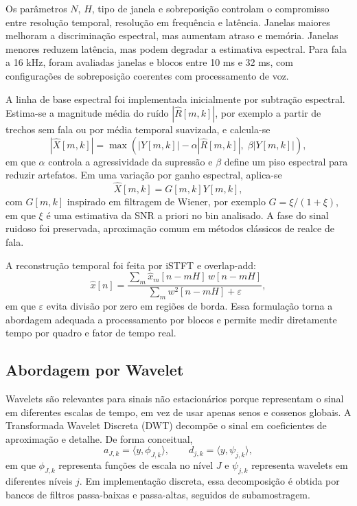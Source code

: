 Os parâmetros \(N\), \(H\), tipo de janela e sobreposição controlam o compromisso entre resolução temporal, resolução em frequência e latência. Janelas maiores melhoram a discriminação espectral, mas aumentam atraso e memória. Janelas menores reduzem latência, mas podem degradar a estimativa espectral. Para fala a 16 kHz, foram avaliadas janelas e blocos entre 10 ms e 32 ms, com configurações de sobreposição coerentes com processamento de voz.

A linha de base espectral foi implementada inicialmente por subtração espectral. Estima-se a magnitude média do ruído \(|\hat{R}[m,k]|\), por exemplo a partir de trechos sem fala ou por média temporal suavizada, e calcula-se
\begin{equation}
    |\hat{X}[m,k]| = \max\left(|Y[m,k]| - \alpha |\hat{R}[m,k]|,\; \beta |Y[m,k]|\right),
    \label{eq:subtracao}
\end{equation}
em que \(\alpha\) controla a agressividade da supressão e \(\beta\) define um piso espectral para reduzir artefatos. Em uma variação por ganho espectral, aplica-se
\begin{equation}
    \hat{X}[m,k] = G[m,k]Y[m,k],
\end{equation}
com \(G[m,k]\) inspirado em filtragem de Wiener, por exemplo \(G=\xi/(1+\xi)\), em que \(\xi\) é uma estimativa da SNR a priori no bin analisado. A fase do sinal ruidoso foi preservada, aproximação comum em métodos clássicos de realce de fala.

A reconstrução temporal foi feita por iSTFT e overlap-add:
\begin{equation}
    \hat{x}[n] =
    \frac{\sum_m \hat{x}_m[n-mH]\,w[n-mH]}
    {\sum_m w^2[n-mH] + \varepsilon},
    \label{eq:ola}
\end{equation}
em que \(\varepsilon\) evita divisão por zero em regiões de borda. Essa formulação torna a abordagem adequada a processamento por blocos e permite medir diretamente tempo por quadro e fator de tempo real.

\subsection{Abordagem por Wavelet}

Wavelets são relevantes para sinais não estacionários porque representam o sinal em diferentes escalas de tempo, em vez de usar apenas senos e cossenos globais. A Transformada Wavelet Discreta (DWT) decompõe o sinal em coeficientes de aproximação e detalhe. De forma conceitual,
\begin{equation}
    a_{J,k} = \langle y,\phi_{J,k}\rangle,\qquad
    d_{j,k} = \langle y,\psi_{j,k}\rangle,
    \label{eq:dwt}
\end{equation}
em que \(\phi_{J,k}\) representa funções de escala no nível \(J\) e \(\psi_{j,k}\) representa wavelets em diferentes níveis \(j\). Em implementação discreta, essa decomposição é obtida por bancos de filtros passa-baixas e passa-altas, seguidos de subamostragem.

